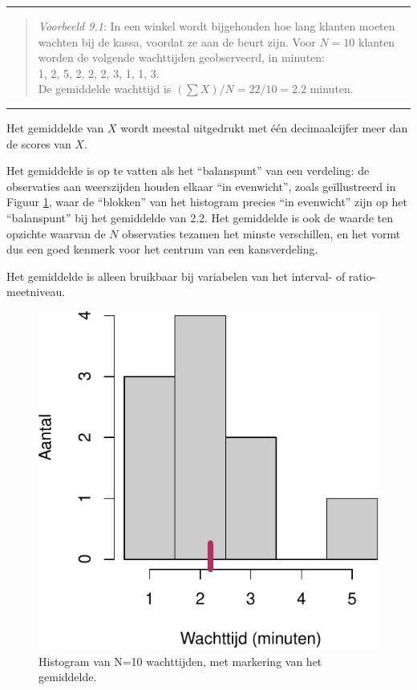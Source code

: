\documentclass[
]{book}
\begin{document}
\begin{center}\rule{0.5\linewidth}{0.5pt}\end{center}

\begin{quote}
\emph{Voorbeeld 9.1}: In
een winkel wordt bijgehouden hoe lang klanten moeten wachten bij de
kassa, voordat ze aan de beurt zijn. Voor \(N=10\) klanten worden de
volgende wachttijden geobserveerd, in minuten:\\
1, 2, 5, 2, 2, 2, 3, 1, 1, 3.\\
De gemiddelde wachttijd is \((\sum X)/N = 22/10 = 2.2\) minuten.
\end{quote}

\begin{center}\rule{0.5\linewidth}{0.5pt}\end{center}

Het gemiddelde van \(X\) wordt meestal uitgedrukt met één decimaalcijfer meer dan
de scores van \(X\).

Het gemiddelde is op te vatten als het ``balanspunt'' van een verdeling:
de observaties aan weerszijden houden elkaar ``in evenwicht'', zoals
geïllustreerd in Figuur \ref{fig:wachttijden-hist}, waar de ``blokken'' van het histogram
precies ``in evenwicht'' zijn op het ``balanspunt'' bij het gemiddelde van
2.2. Het gemiddelde is ook de waarde ten opzichte waarvan de \(N\)
observaties tezamen het minste verschillen, en het vormt dus een goed
kenmerk voor het centrum van een kansverdeling.

Het gemiddelde is alleen bruikbaar bij variabelen van het interval- of
ratio-meetniveau.

\begin{figure}
\centering
\includegraphics{MS1NL-boek_files/figure-latex/wachttijden-hist-1.pdf}
\caption{\label{fig:wachttijden-hist}Histogram van N=10 wachttijden, met markering van het gemiddelde.}
\end{figure}
\end{document}
